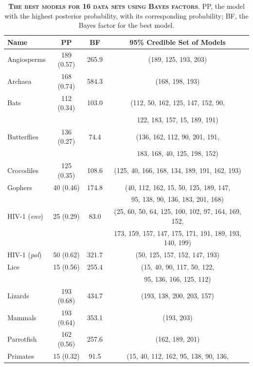 \documentclass{svmult}
\begin{document}
\begin{table}[b]
\centering
\caption{\textbf{\textsc{The best models for 16 data sets using Bayes factors}}.  PP, the model
with the highest posterior probability, with its corresponding probability; BF, the Bayes
factor for the best model.}
\begin{tabular}{l c c c} \hline
Name & PP & BF & 95\% Credible Set of Models \\ \hline
Angiosperms               &  189 (0.57) & 265.9 & (189, 125, 193, 203) \\
Archaea                        & 168 (0.74) & 584.3 & (168, 198, 193) \\
Bats                               & 112 (0.34) & 103.0 & (112, 50, 162, 125, 147, 152, 90, \\
                                         &            &       & 122, 183, 157, 15, 189, 191) \\
Butterflies               & 136 (0.27) &  74.4 & (136, 162, 112, 90, 201, 191, \\
                            &            &       & 183, 168, 40, 125, 198, 152) \\
Crocodiles                 & 125 (0.35) & 108.6 & (125, 40, 166, 168, 134, 189, 191, 162, 193) \\
Gophers                   &  40 (0.46) & 174.8 & (40, 112, 162, 15, 50, 125, 189, 147, \\
                               &            &       & 95, 138, 90, 136, 183, 201, 168) \\
HIV-1 ({\it env})          &  25 (0.29) &  83.0 & (25, 60, 50, 64, 125, 100, 102, 97, 164, 169, 152,\\ 
                              &            &       & 173, 159, 157, 147, 175, 171, 191, 189, 193, 140, 199)\\ 
HIV-1 ({\it pol})       &  50 (0.62) & 321.7 & (50, 125, 157, 152, 147, 193) \\
Lice                      &  15 (0.56) & 255.4 & (15, 40, 90, 117, 50, 122, \\
                           &            &       & 95, 136, 166, 125, 112) \\
Lizards                   & 193 (0.68) & 434.7 & (193, 138, 200, 203, 157) \\
Mammals                    & 193 (0.64) & 353.1 & (193, 203) \\
Parrotfish                 & 162 (0.56) & 257.6 & (162, 189, 201) \\
Primates                   &  15 (0.32) &  91.5 & (15, 40, 112, 162, 95, 138, 90, 136, \\

\end{tabular}
\end{table}
\end{document}
